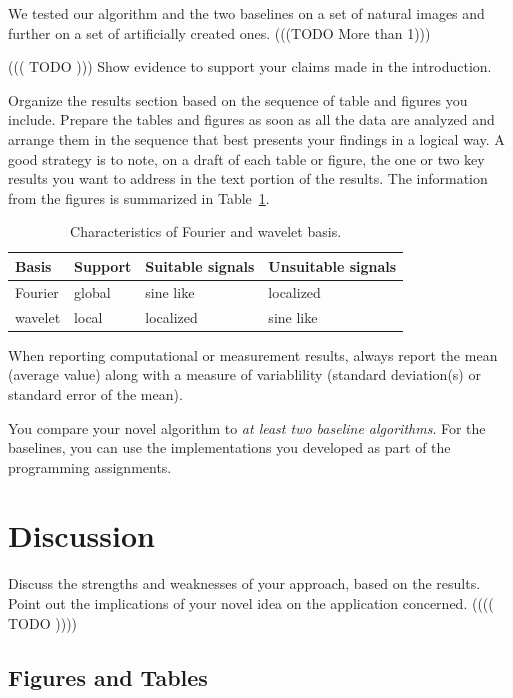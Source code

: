 \documentclass[10pt,conference,compsocconf]{IEEEtran}
\begin{document}
 We tested our algorithm and the two baselines on a set of natural images and further on a set of artificially created ones. (((TODO More than 1))) 
 
 ((( TODO )))
  Show evidence to support your claims made in the
  introduction. 
  
Organize the results section based on the sequence of table and
figures you include. Prepare the tables and figures as soon as all
the data are analyzed and arrange them in the sequence that best
presents your findings in a logical way. A good strategy is to note,
on a draft of each table or figure, the one or two key results you
want to address in the text portion of the results.
The information from the figures is
summarized in Table~\ref{tab:fourier-wavelet}.

\begin{table}[htbp]
  \centering
  \begin{tabular}[c]{|l||l|l|l|}
    \hline
    Basis&Support&Suitable signals&Unsuitable signals\\
    \hline
    Fourier&global&sine like&localized\\
    wavelet&local&localized&sine like\\
    \hline
  \end{tabular}
  \caption{Characteristics of Fourier and wavelet basis.}
  \label{tab:fourier-wavelet}
\end{table}

When reporting computational or measurement results, always
report the mean (average value) along with a measure of variablility
(standard deviation(s) or standard error of the mean).

You compare your novel algorithm to \emph{at least two baseline
  algorithms}. For the baselines, you can use the implementations you
developed as part of the programming assignments.

\section{Discussion}
  Discuss the strengths and weaknesses of your
  approach, based on the results. Point out the implications of your  
  novel idea on the application concerned. (((( TODO ))))


\subsection{Figures and Tables}
\end{document}

